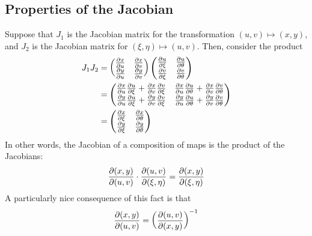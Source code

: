 \documentclass{../template/note}
\begin{document}
    \subsection{Properties of the Jacobian}

    Suppose that \(J_1\) is the Jacobian matrix for the transformation \((u, v) \mapsto (x, y)\), and \(J_2\) is the Jacobian matrix for \((\xi, \eta) \mapsto (u, v)\). Then, consider the product
    \begin{align*}
        J_1J_2 &= \begin{pmatrix}
            \pd x u & \pd x v \\
            \pd y u & \pd y v \\
        \end{pmatrix}\begin{pmatrix}
            \pd u \xi & \pd u \theta \\
            \pd v \xi & \pd v \theta \\
        \end{pmatrix} \\
        &= \begin{pmatrix}
            \pd x u \pd u \xi + \pd x v \pd v \xi & \pd x u \pd u \theta + \pd x v \pd v \theta \\
            \pd y u \pd u \xi + \pd y v \pd v \xi & \pd y u \pd u \theta + \pd y v \pd v \theta \\
        \end{pmatrix} \\
        &= \begin{pmatrix}
            \pd x \xi & \pd x \theta \\
            \pd y \xi & \pd y \theta \\
        \end{pmatrix}
    \end{align*}
    In other words, the Jacobian of a composition of maps is the product of the Jacobians:
    \begin{align*}
        \pd{(x, y)}{(u, v)} \cdot \pd{(u, v)}{(\xi, \eta)} = \pd{(x, y)}{(\xi, \eta)}
    \end{align*}
    A particularly nice consequence of this fact is that
    \begin{align*}
        \pd{(x, y)}{(u, v)} = \left(\pd{(u, v)}{(x, y)}\right)^{-1}
    \end{align*}
    
\end{document}
